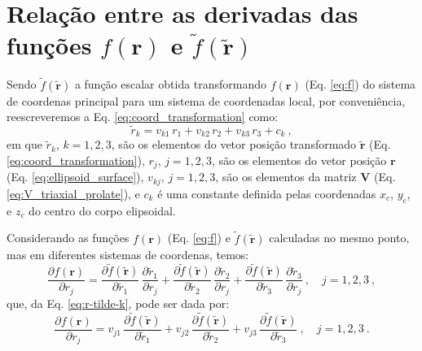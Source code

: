 \chapter{Relação entre as derivadas das funções $f(\mathbf{r})$ e $\tilde{f}(\tilde{\mathbf{r}})$}

Sendo $\tilde{f}(\tilde{\mathbf{r}})$ a função escalar obtida transformando
$f(\mathbf{r})$ (Eq. \ref{eq:f}) do sistema de coordenas principal para um 
sistema de coordenadas local, por conveniência, reescreveremos a Eq. 
\ref{eq:coord_transformation} como:
\begin{equation}
\tilde{r}_{k} = v_{k1} \, r_{1} + v_{k2} \, r_{2} + v_{k3} \, r_{3} + c_{k} \: ,
\label{eq:r-tilde-k}
\end{equation}
em que $\tilde{r}_{k}$, $k = 1, 2, 3$, são os elementos do vetor posição
transformado $\tilde{\mathbf{r}}$ (Eq. \ref{eq:coord_transformation}),
$r_{j}$, $j = 1, 2, 3$, são os elementos do vetor posição
$\mathbf{r}$ (Eq. \ref{eq:ellipsoid_surface}),
$v_{kj}$, $j = 1, 2, 3$, são os elementos da matriz
$\mathbf{V}$ (Eq. \ref{eq:V_triaxial_prolate}),
e $c_{k}$ é uma constante definida pelas coordenadas
$x_{c}$, $y_{c}$, e $z_{c}$ do centro do corpo elipsoidal.

Considerando as funções $f(\mathbf{r})$ 
(Eq. \ref{eq:f}) e $\tilde{f}(\tilde{\mathbf{r}})$
calculadas no mesmo ponto, mas em diferentes sistemas
de coordenas, temos:
\begin{equation*}
\frac{\partial f(\mathbf{r})}{\partial r_{j}} = 
\frac{\partial \tilde{f}(\tilde{\mathbf{r}})}{\partial \tilde{r}_{1}} \,
\frac{\partial \tilde{r}_{1}}{\partial r_{j}} +
\frac{\partial \tilde{f}(\tilde{\mathbf{r}})}{\partial \tilde{r}_{2}} \,
\frac{\partial \tilde{r}_{2}}{\partial r_{j}} +
\frac{\partial \tilde{f}(\tilde{\mathbf{r}})}{\partial \tilde{r}_{3}} \,
\frac{\partial \tilde{r}_{3}}{\partial r_{j}} \: ,
\quad j = 1, 2, 3 \: ,
\end{equation*}
que, da Eq. \ref{eq:r-tilde-k}, pode ser dada por:
\begin{equation}
\frac{\partial f(\mathbf{r})}{\partial r_{j}} = 
v_{j1} \, \frac{\partial \tilde{f}(\tilde{\mathbf{r}})}{\partial \tilde{r}_{1}} +
v_{j2} \, \frac{\partial \tilde{f}(\tilde{\mathbf{r}})}{\partial \tilde{r}_{2}} +
v_{j3} \, \frac{\partial \tilde{f}(\tilde{\mathbf{r}})}{\partial \tilde{r}_{3}} \: ,
\quad j = 1, 2, 3 \: .
\label{eq:df_drj}
\end{equation}

